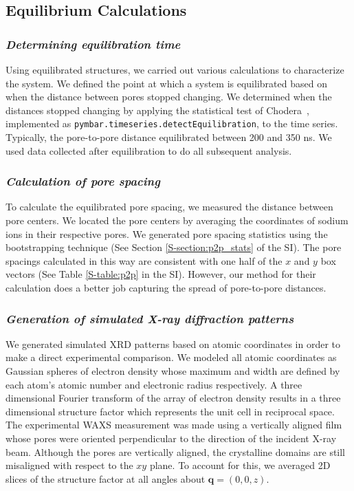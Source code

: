 \documentclass[journal=jpcbfk,manuscript=article]{achemso}
\begin{document}
  \subsection{Equilibrium Calculations}

  \subsubsection{\textit{Determining equilibration time}}\label{method:equil_time}

  Using equilibrated structures, we carried out various calculations to
  characterize the system. We defined the point at which a system is equilibrated
  based on when the distance between pores stopped changing.  We determined when
  the distances stopped changing by applying the statistical test of Chodera~\cite{chodera_simple_2016},
  implemented as \texttt{pymbar.timeseries.detectEquilibration}, to the time series. Typically, the pore-to-pore
  distance equilibrated between 200 and 350 ns. We used data collected after 
  equilibration to do all subsequent analysis.

  \subsubsection{\textit{Calculation of pore spacing}}\label{method:pore_spacing}

  To calculate the equilibrated pore spacing, we measured the distance between
  pore centers. We located the pore centers by averaging the coordinates of
  sodium ions in their respective pores. We generated pore spacing statistics
  using the bootstrapping technique (See Section \ref{S-section:p2p_stats} of the
  SI). The pore spacings calculated in this way are consistent with one half of
  the $x$ and $y$ box vectors (See Table \ref{S-table:p2p} in the SI). However,
  our method for their calculation does a better job capturing the spread of
  pore-to-pore distances.

  \subsubsection{\textit{Generation of simulated X-ray diffraction patterns}}\label{method:xrd}
  
  We generated simulated XRD patterns based on atomic coordinates in order to
  make a direct experimental comparison. We modeled all atomic coordinates as
  Gaussian spheres of electron density whose maximum and width are defined by
  each atom's atomic number and electronic radius respectively. A three dimensional
  Fourier transform of the array of electron density results in a three
  dimensional structure factor which represents the unit cell in reciprocal
  space. The experimental WAXS measurement was made using a vertically aligned
  film whose pores were oriented perpendicular to the direction of the incident
  X-ray beam. Although the pores are vertically aligned, the crystalline domains are
  still misaligned with respect to the $xy$ plane. To account for this, we averaged
  2D slices of the structure factor at all angles about $\mathbf{q} = (0, 0, z)$. 
\end{document}
